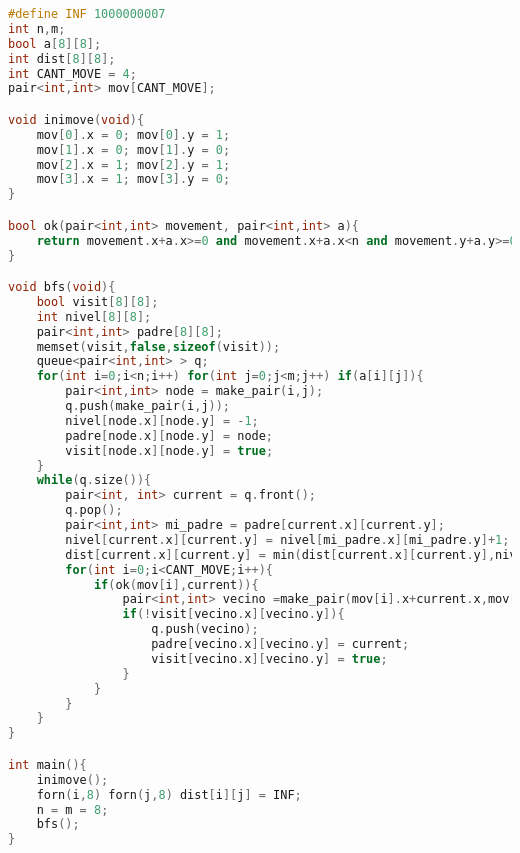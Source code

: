 \begin{lstlisting}[language=C++]
#define INF 1000000007
int n,m;
bool a[8][8];
int dist[8][8];
int CANT_MOVE = 4;
pair<int,int> mov[CANT_MOVE];

void inimove(void){
    mov[0].x = 0; mov[0].y = 1;
    mov[1].x = 0; mov[1].y = 0;
    mov[2].x = 1; mov[2].y = 1;
    mov[3].x = 1; mov[3].y = 0;
}

bool ok(pair<int,int> movement, pair<int,int> a){
    return movement.x+a.x>=0 and movement.x+a.x<n and movement.y+a.y>=0 and movement.y+a.y<m;  
}

void bfs(void){
    bool visit[8][8];
    int nivel[8][8];
    pair<int,int> padre[8][8];
    memset(visit,false,sizeof(visit));
    queue<pair<int,int> > q;
    for(int i=0;i<n;i++) for(int j=0;j<m;j++) if(a[i][j]){
        pair<int,int> node = make_pair(i,j);
        q.push(make_pair(i,j));
        nivel[node.x][node.y] = -1;
        padre[node.x][node.y] = node;
        visit[node.x][node.y] = true;
    }
    while(q.size()){
        pair<int, int> current = q.front();
        q.pop();
        pair<int,int> mi_padre = padre[current.x][current.y];
        nivel[current.x][current.y] = nivel[mi_padre.x][mi_padre.y]+1;
        dist[current.x][current.y] = min(dist[current.x][current.y],nivel[current.x][current.y]);
        for(int i=0;i<CANT_MOVE;i++){
            if(ok(mov[i],current)){
                pair<int,int> vecino =make_pair(mov[i].x+current.x,mov[i].y+current.y);
                if(!visit[vecino.x][vecino.y]){
                    q.push(vecino);
                    padre[vecino.x][vecino.y] = current;
                    visit[vecino.x][vecino.y] = true;
                }
            }
        }  
    }
}

int main(){
    inimove();
    forn(i,8) forn(j,8) dist[i][j] = INF;
    n = m = 8;
    bfs();
}
\end{lstlisting}